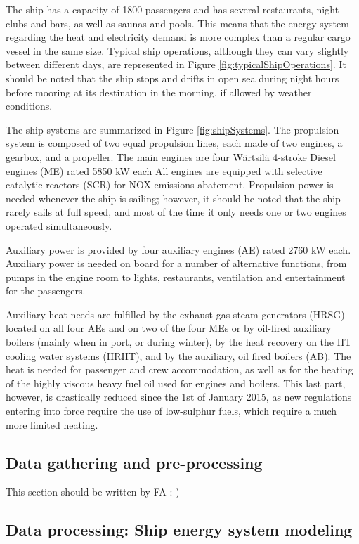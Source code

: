 \documentclass[preprint,12pt]{elsarticle}
\begin{document}
The ship has a capacity of 1800 passengers and has several restaurants, night clubs and bars, as well as saunas and pools. This means that the energy system regarding the heat and electricity demand is more complex than a regular cargo vessel in the same size. Typical ship operations, although they can vary slightly between different days, are represented in Figure \ref{fig:typicalShipOperations}. It should be noted that the ship stops and drifts in open sea during night hours before mooring at its destination in the morning, if allowed by weather conditions.

The ship systems are summarized in Figure \ref{fig:shipSystems}. The propulsion system is composed of two equal propulsion lines, each made of two engines, a gearbox, and a propeller. The main engines are four Wärtsilä 4-stroke Diesel engines (ME) rated 5850 kW each All engines are equipped with selective catalytic reactors (SCR) for NOX emissions abatement. Propulsion power is needed whenever the ship is sailing; however, it should be noted that the ship rarely sails at full speed, and most of the time it only needs one or two engines operated simultaneously.

Auxiliary power is provided by four auxiliary engines (AE) rated 2760 kW each. Auxiliary power is needed on board for a number of alternative functions, from pumps in the engine room to lights, restaurants, ventilation and entertainment for the passengers. 

Auxiliary heat needs are fulfilled by the exhaust gas steam generators (HRSG) located on all four AEs and on two of the four MEs or by oil-fired auxiliary boilers (mainly when in port, or during winter), by the heat recovery on the HT cooling water systems (HRHT), and by the auxiliary, oil fired boilers (AB). The heat is needed for passenger and crew accommodation, as well as for the heating of the highly viscous heavy fuel oil used for engines and boilers. This last part, however, is drastically reduced since the 1st of January 2015, as new regulations entering into force require the use of low-sulphur fuels, which require a much more limited heating.

\subsection{Data gathering and pre-processing} \label{sec:met:gathering}

This section should be written by FA :-)

\subsection{Data processing: Ship energy system modeling} \label{sec:met:modeling}
\end{document}
